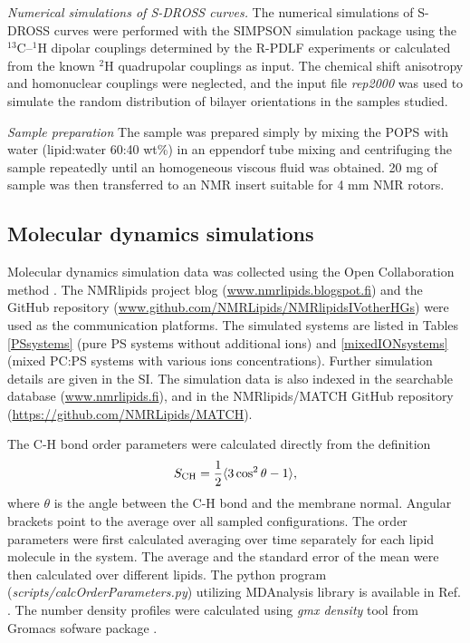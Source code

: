 \documentclass[aps,prl,superscriptaddress,twocolumn]{revtex4}
\begin{document}
\emph{Numerical simulations of S-DROSS curves.}
The numerical simulations of S-DROSS curves were performed with the SIMPSON simulation package \cite{bak00} using the $^{13}$C--$^1$H
dipolar couplings determined by the R-PDLF experiments or calculated from the known $^2$H quadrupolar couplings \cite{browning80} as input.
The chemical shift anisotropy and homonuclear couplings were neglected, and the input file {\it{rep2000}} was used to simulate the random
distribution of bilayer orientations in the samples studied.

\emph{Sample preparation}
The sample was prepared simply by mixing the POPS with water (lipid:water 60:40 wt\%) in an eppendorf
tube mixing and centrifuging the sample repeatedly until an homogeneous viscous fluid was obtained.
20 mg of sample was then transferred to an NMR insert suitable for 4 mm NMR rotors.  


\subsection{Molecular dynamics simulations}
Molecular dynamics simulation data was collected using
the Open Collaboration method \cite{botan15}.
The NMRlipids project blog (\url{www.nmrlipids.blogspot.fi}) and
the GitHub repository (\url{www.github.com/NMRLipids/NMRlipidsIVotherHGs})
were used as the communication platforms.
The simulated systems are listed in 
Tables \ref{PSsystems} (pure PS systems without additional ions) 
and \ref{mixedIONsystems} (mixed PC:PS systems with various ions concentrations).
Further simulation details are given in the SI.
The simulation data is also indexed in the
searchable database (\url{www.nmrlipids.fi}),
and in the NMRlipids/MATCH GitHub repository (\url{https://github.com/NMRLipids/MATCH}).

The C-H bond order parameters were calculated directly
from the definition
\begin{equation}
S_{\rm CH}=\frac{1}{2}\langle 3\cos^2\theta -1 \rangle,
\end{equation}
where $\theta$ is the angle between the C-H bond and the membrane normal.
Angular brackets point to the average over all sampled configurations.
The order parameters were first calculated averaging over time separately
for each lipid molecule in the system. The average and
the standard error of the mean were then calculated over different lipids.
The python program ({\it scripts/calcOrderParameters.py}) utilizing
MDAnalysis library \cite{agrawal11,gowers16} is available in Ref. . 
The number density profiles were calculated using {\it gmx density} tool
from Gromacs sofware package \cite{gromacsMANUAL}.
\end{document}
